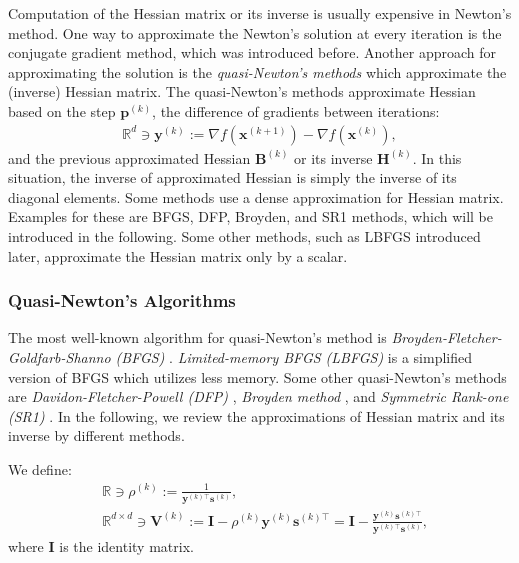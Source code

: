 \documentclass[lang=cn,10pt]{gorgeousnbook}
\numberwithin{equation}{section}%
\numberwithin{figure}{section}%
\begin{document}
Computation of the Hessian matrix or its inverse is usually expensive in Newton's method. 
One way to approximate the Newton's solution at every iteration is the conjugate gradient method, which was introduced before. Another approach for approximating the solution is the \textit{quasi-Newton's methods} which approximate the (inverse) Hessian matrix.
The quasi-Newton's methods approximate Hessian based on the step $\boldsymbol{p}^{(k)}$, the difference of gradients between iterations:
\begin{align}
\mathbb{R}^d \ni \boldsymbol{y}^{(k)} := \nabla f(\boldsymbol{x}^{(k+1)}) - \nabla f(\boldsymbol{x}^{(k)}),
\end{align}
and the previous approximated Hessian $\boldsymbol{B}^{(k)}$ or its inverse $\boldsymbol{H}^{(k)}$.
In this situation, the inverse of approximated Hessian is simply the inverse of its diagonal elements. 
Some methods use a dense approximation for Hessian matrix. Examples for these are BFGS, DFP, Broyden, and SR1 methods, which will be introduced in the following. 
Some other methods, such as LBFGS introduced later, approximate the Hessian matrix only by a scalar. 

\subsubsection{Quasi-Newton's Algorithms}


The most well-known algorithm for quasi-Newton's method is \textit{Broyden-Fletcher-Goldfarb-Shanno (BFGS)} \cite{fletcher1987practical,dennis1996numerical}. \textit{Limited-memory BFGS (LBFGS)} \cite{nocedal1980updating,liu1989limited} is a simplified version of BFGS which utilizes less memory. 
Some other quasi-Newton's methods are \textit{Davidon-Fletcher-Powell (DFP)} \cite{davidon1991variable,fletcher1987practical}, \textit{Broyden method} \cite{broyden1965class}, and \textit{Symmetric Rank-one (SR1)} \cite{conn1991convergence}.
In the following, we review the approximations of Hessian matrix and its inverse by different methods.

We define:
\begin{align}
& \mathbb{R} \ni \rho^{(k)} := \frac{1}{\boldsymbol{y}^{(k)\top} \boldsymbol{s}^{(k)}}, \\
& \mathbb{R}^{d \times d} \ni \boldsymbol{V}^{(k)} := \boldsymbol{I} - \rho^{(k)} \boldsymbol{y}^{(k)} \boldsymbol{s}^{(k)\top} = \boldsymbol{I} - \frac{\boldsymbol{y}^{(k)} \boldsymbol{s}^{(k)\top}}{\boldsymbol{y}^{(k)\top} \boldsymbol{s}^{(k)}},
\end{align}
where $\boldsymbol{I}$ is the identity matrix. 
\end{document}
